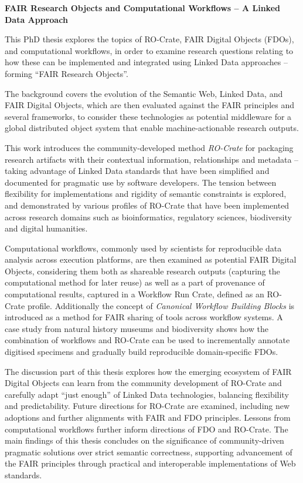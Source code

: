 \textbf{FAIR Research Objects and Computational Workflows – A Linked Data Approach}

This PhD thesis explores the topics of RO-Crate, FAIR Digital Objects (FDOs), and computational workflows, in order to examine research questions relating to how these can be implemented and integrated using Linked Data approaches -- forming ``FAIR Research Objects''.

The background covers the evolution of the Semantic Web, Linked Data, and FAIR Digital Objects, which are then evaluated against the FAIR principles and several frameworks, to consider these technologies as potential middleware for a global distributed object system that enable machine-actionable research outputs. 

This work introduces the community-developed method \emph{RO-Crate} for packaging research artifacts with their contextual information, relationships and metadata -- taking advantage of Linked Data standards that have been simplified and documented for pragmatic use by software developers. The tension between flexibility for implementations and rigidity of semantic constraints is explored, and demonstrated by various profiles of RO-Crate that have been implemented across research domains such as bioinformatics, regulatory sciences, biodiversity and digital humanities. 

Computational workflows, commonly used by scientists for reproducible data analysis across execution platforms, are then examined as potential FAIR Digital Objects, considering them both as shareable research outputs (capturing the computational method for later reuse) as well as a part of provenance of computational results, captured in a Workflow Run Crate, defined as an RO-Crate profile. 
Additionally the concept of \emph{Canonical Workflow Building Blocks} is introduced as a method for FAIR sharing of tools across workflow systems. A case study from natural history museums and biodiversity shows how the combination of workflows and RO-Crate can be used to incrementally annotate digitised specimens and gradually build reproducible domain-specific FDOs. 

The discussion part of this thesis explores how the emerging ecosystem of FAIR Digital Objects can learn from the community development of RO-Crate and carefully adapt ``just enough'' of Linked Data technologies, balancing flexibility and predictability. Future directions for RO-Crate are examined, including new adoptions and further alignments with FAIR and FDO principles. Lessons from computational workflows further inform directions of FDO and RO-Crate. The main findings of this thesis concludes on the significance of community-driven pragmatic solutions over strict semantic correctness, supporting advancement of the FAIR principles through practical and interoperable implementations of Web standards.

